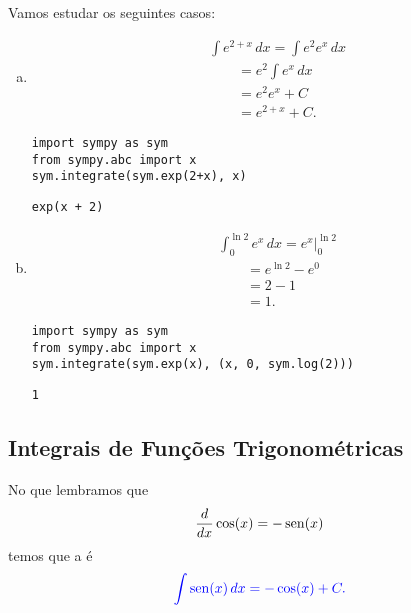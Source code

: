 \begin{ex}
  Vamos estudar os seguintes casos:
  \begin{enumerate}[a)]
  \item
    \begin{align}
      & \int e^{2 + x}\,dx = \int e^2e^x\,dx \\
      &\text{}\qquad = e^2\int e^x\,dx \\
      &\text{}\qquad = e^2e^x + C \\
      &\text{}\qquad = e^{2+x} + C.
    \end{align}

\begin{lstlisting}
import sympy as sym
from sympy.abc import x
sym.integrate(sym.exp(2+x), x)
\end{lstlisting}

\begin{verbatim}
exp(x + 2)  
\end{verbatim}

  \item
    \begin{align}
      & \int_{0}^{\ln 2}e^x\,dx = \left. e^x\right|_0^{\ln 2}\\
      &\text{}\qquad = e^{\ln 2} - e^0\\
      &\text{}\qquad = 2 - 1\\
      &\text{}\qquad = 1.
    \end{align}

\begin{lstlisting}
import sympy as sym
from sympy.abc import x
sym.integrate(sym.exp(x), (x, 0, sym.log(2)))
\end{lstlisting}

\begin{verbatim}
1
\end{verbatim}

\end{enumerate}
\end{ex}

\subsection{Integrais de Funções Trigonométricas}\label{cap_int_sec_regrasbasic_trigo}

No que lembramos que
\begin{equation}
  \frac{d}{dx}\cos(x) = -\operatorname{sen}(x)
\end{equation}
temos que a  é
\begin{equation}\color{blue}\int \operatorname{sen}(x)\,dx = -\cos(x) + C.
\end{equation}

